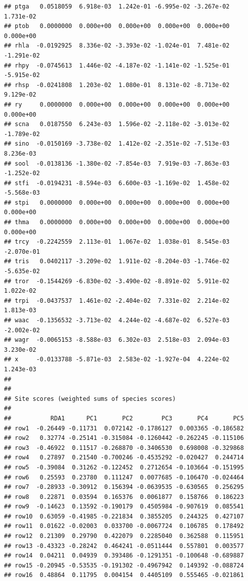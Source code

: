 \documentclass[
]{article}
\begin{document}
\begin{verbatim}
## ptga   0.0518059  6.918e-03  1.242e-01 -6.995e-02 -3.267e-02  1.731e-02
## ptob   0.0000000  0.000e+00  0.000e+00  0.000e+00  0.000e+00  0.000e+00
## rhla  -0.0192925  8.336e-02 -3.393e-02 -1.024e-01  7.481e-02 -1.291e-02
## rhpy  -0.0745613  1.446e-02 -4.187e-02 -1.141e-02 -1.525e-01 -5.915e-02
## rhsp  -0.0241808  1.203e-02  1.080e-01  8.131e-02 -8.713e-02  9.129e-02
## ry     0.0000000  0.000e+00  0.000e+00  0.000e+00  0.000e+00  0.000e+00
## scna   0.0187550  6.243e-03  1.596e-02 -2.118e-02 -3.013e-02 -1.789e-02
## sino  -0.0150169 -3.738e-02  1.412e-02 -2.351e-02 -7.513e-03  8.236e-03
## sool  -0.0138136 -1.380e-02 -7.854e-03  7.919e-03 -7.863e-03 -1.252e-02
## stfi  -0.0194231 -8.594e-03  6.600e-03 -1.169e-02  1.458e-02 -5.568e-03
## stpi   0.0000000  0.000e+00  0.000e+00  0.000e+00  0.000e+00  0.000e+00
## thma   0.0000000  0.000e+00  0.000e+00  0.000e+00  0.000e+00  0.000e+00
## trcy  -0.2242559  2.113e-01  1.067e-02  1.038e-01  8.545e-03 -2.070e-01
## tris   0.0402117 -3.209e-02  1.911e-02 -8.204e-03 -1.746e-02 -5.635e-02
## tror  -0.1544269 -6.830e-02 -3.490e-02 -8.891e-02  5.911e-02  1.022e-02
## trpi  -0.0437537  1.461e-02 -2.404e-02  7.331e-02  2.214e-02  1.813e-03
## waac  -0.1356532 -3.713e-02  4.244e-02 -4.687e-02  6.527e-03 -2.002e-02
## wagr  -0.0065153 -8.588e-03  6.302e-03  2.518e-03  2.094e-03  3.230e-02
## x     -0.0133788 -5.871e-03  2.583e-02 -1.927e-04  4.224e-02  1.243e-03
## 
## 
## Site scores (weighted sums of species scores)
## 
##           RDA1      PC1       PC2        PC3       PC4       PC5
## row1  -0.26449 -0.11731  0.072142 -0.1786127  0.003365 -0.186582
## row2   0.32774 -0.25141 -0.315084 -0.1260442 -0.262245 -0.115106
## row3  -0.46922  0.11517 -0.268870 -0.3406530  0.698008 -0.329868
## row4   0.27897  0.21540 -0.700246 -0.4535292 -0.020427  0.244714
## row5  -0.39084  0.31262 -0.122452  0.2712654 -0.103664 -0.151995
## row6   0.25593  0.23780  0.111247  0.0077685 -0.106470 -0.024464
## row7  -0.28933 -0.30912  0.156394 -0.0639535 -0.630565  0.256295
## row8   0.22871  0.03594  0.165376  0.0061877  0.158766  0.186223
## row9  -0.14623  0.13592 -0.190179  0.4505984 -0.907619  0.085541
## row10  0.63059 -0.41985 -0.221834  0.3855205  0.244325  0.427107
## row11  0.01622 -0.02003  0.033700 -0.0067724  0.106785  0.178492
## row12  0.21309  0.29790  0.422079  0.2285040  0.362588  0.115951
## row13 -0.43323 -0.28242  0.464241 -0.0511444  0.557801  0.003577
## row14  0.04211  0.04939  0.393486 -0.1291351 -0.100648 -0.689887
## row15 -0.20945 -0.53535 -0.191302 -0.4967942  0.149392 -0.088724
## row16  0.48864  0.11795  0.004154  0.4405109  0.555465 -0.021861

\end{verbatim}
\end{document}
